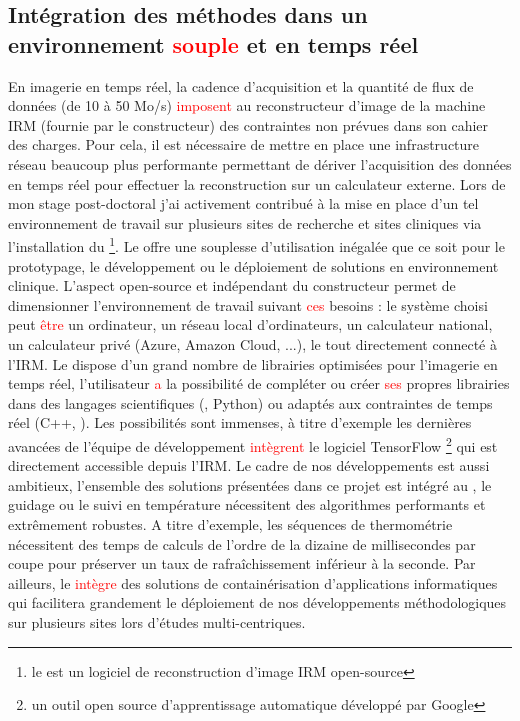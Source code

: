 \subsection{Intégration des méthodes dans un environnement \textcolor{red}{souple} et en temps réel}

En imagerie en temps réel, la cadence d’acquisition et la quantité de flux de données (de 10 à 50 Mo/s) \textcolor{red}{imposent} au reconstructeur d’image de la machine IRM (fournie par le constructeur) des contraintes non prévues dans son cahier des charges. Pour cela, il est nécessaire de mettre en place une infrastructure réseau beaucoup plus performante permettant de dériver l’acquisition des données en temps réel pour effectuer la reconstruction sur un calculateur externe. Lors de mon stage post-doctoral j’ai activement contribué à la mise en place d’un tel environnement de travail sur plusieurs sites de recherche et sites cliniques via l’installation du \GADGETRON\footnote{le \GADGETRON est un logiciel de reconstruction d’image IRM open-source}. Le \GADGETRON offre une souplesse d’utilisation inégalée que ce soit pour le prototypage, le développement ou le déploiement de solutions en environnement clinique. L’aspect open-source et indépendant du constructeur permet de dimensionner l’environnement de travail suivant \textcolor{red}{ces} besoins : le système choisi peut \textcolor{red}{être} un ordinateur, un réseau local d’ordinateurs, un calculateur national, un calculateur privé (Azure, Amazon Cloud, ...), le tout directement connecté à l’IRM. Le \GADGETRON dispose d’un grand nombre de librairies optimisées pour l’imagerie en temps réel, l’utilisateur \textcolor{red}{a} la possibilité de compléter ou créer \textcolor{red}{ses} propres librairies dans des langages scientifiques (\MATLAB, Python) ou adaptés aux contraintes de temps réel (C++, \CUDA). Les possibilités sont immenses, à titre d’exemple les dernières avancées de l’équipe de développement \textcolor{red}{intègrent} le logiciel TensorFlow \footnote{un outil open source d’apprentissage automatique développé par Google} qui est directement accessible depuis l’IRM. Le cadre de nos développements est aussi ambitieux, l’ensemble des solutions présentées dans ce projet est intégré au \GADGETRON, le guidage ou le suivi en température nécessitent des algorithmes performants et extrêmement robustes. A titre d’exemple, les séquences de thermométrie nécessitent des temps de calculs de l’ordre de la dizaine de millisecondes par coupe pour préserver un taux de rafraîchissement inférieur à la seconde. Par ailleurs, le \GADGETRON \textcolor{red}{intègre} des solutions de containérisation d’applications informatiques qui facilitera grandement le déploiement de nos développements méthodologiques sur plusieurs sites lors d’études multi-centriques\cite{de2024fully,de2024advanced}.\\
